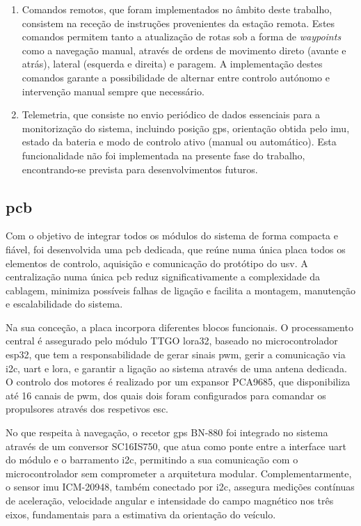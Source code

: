 \begin{enumerate}
    \item Comandos remotos, que foram implementados no âmbito deste trabalho, consistem na receção de instruções provenientes da estação remota. Estes comandos permitem tanto a atualização de rotas sob a forma de \emph{waypoints} como a navegação manual, através de ordens de movimento direto (avante e atrás), lateral (esquerda e direita) e paragem. A implementação destes comandos garante a possibilidade de alternar entre controlo autónomo e intervenção manual sempre que necessário.  
    \item Telemetria, que consiste no envio periódico de dados essenciais para a monitorização do sistema, incluindo posição \gls{gps}, orientação obtida pelo \gls{imu}, estado da bateria e modo de controlo ativo (manual ou automático). Esta funcionalidade não foi implementada na presente fase do trabalho, encontrando-se prevista para desenvolvimentos futuros.  
\end{enumerate}

\subsection{\acrfull{pcb}}
\label{subsec:pcb}

Com o objetivo de integrar todos os módulos do sistema de forma compacta e fiável, foi desenvolvida uma \gls{pcb} dedicada, que reúne numa única placa todos os elementos de controlo, aquisição e comunicação do protótipo do \gls{usv}. A centralização numa única \gls{pcb} reduz significativamente a complexidade da cablagem, minimiza possíveis falhas de ligação e facilita a montagem, manutenção e escalabilidade do sistema.  

Na sua conceção, a placa incorpora diferentes blocos funcionais. O processamento central é assegurado pelo módulo TTGO \gls{lora}32, baseado no microcontrolador \gls{esp32}, que tem a responsabilidade de gerar sinais \gls{pwm}, gerir a comunicação via \gls{i2c}, \gls{uart} e \gls{lora}, e garantir a ligação ao sistema através de uma antena dedicada. O controlo dos motores é realizado por um expansor PCA9685, que disponibiliza até 16 canais de \gls{pwm}, dos quais dois foram configurados para comandar os propulsores através dos respetivos \gls{esc}.  

No que respeita à navegação, o recetor \gls{gps} BN-880 foi integrado no sistema através de um conversor SC16IS750, que atua como ponte entre a interface \gls{uart} do módulo e o barramento \gls{i2c}, permitindo a sua comunicação com o microcontrolador sem comprometer a arquitetura modular. Complementarmente, o sensor \gls{imu} ICM-20948, também conectado por \gls{i2c}, assegura medições contínuas de aceleração, velocidade angular e intensidade do campo magnético nos três eixos, fundamentais para a estimativa da orientação do veículo.  

